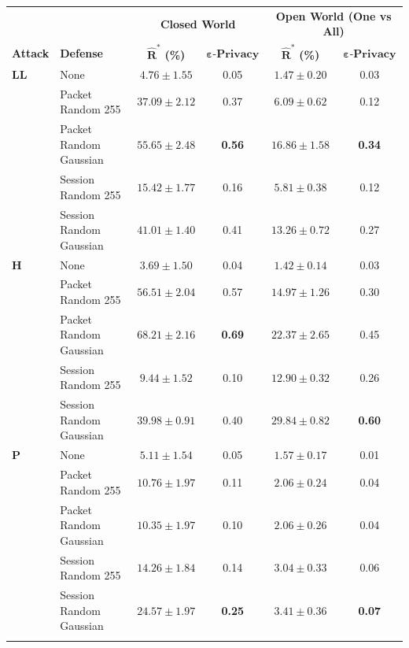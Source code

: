 \documentclass[
	ruledheaders=chapter,
	class=report,
	thesis={type=master, department=inf},
	accentcolor=1c,
	custommargins=true,
	marginpar=false,
	parskip=half-,
	fontsize=11pt,
]{tudapub}
\begin{document}
	\begin{table}
		\centering
		\small
		\begin{tabular}{llcccc}
			\toprule 
			& & \multicolumn{2}{c}{\textbf{Closed World}} & \multicolumn{2}{c}{\textbf{Open World (One vs All)}} \\
			\textbf{Attack} & \textbf{Defense} & $\mathbf{\widehat{R}^*}$ \textbf{(\%)} & $\mathbf{\varepsilon}\textbf{-Privacy}$ & $\mathbf{\widehat{R}^*}$ \textbf{(\%)} & $\mathbf{\varepsilon}\textbf{-Privacy}$ \\
			\midrule
			\textbf{LL} & None & $4.76 \pm 1.55$ & 0.05 & $1.47\pm 0.20$ & 0.03 \\
			 & Packet Random 255 & $37.09 \pm 2.12$ & 0.37 & $6.09\pm 0.62$ & 0.12 \\
			 & Packet Random Gaussian & $\mathbf{55.65 \pm 2.48}$ & \textbf{0.56} & $\mathbf{16.86\pm 1.58}$ & \textbf{0.34} \\
			 & Session Random 255 & $15.42 \pm 1.77$ & 0.16 & $5.81\pm 0.38$ & 0.12 \\
			 & Session Random Gaussian & $41.01 \pm 1.40$ & 0.41 & $13.26\pm 0.72$ & 0.27 \\ \addlinespace
			 
		    \textbf{H} & None & $3.69 \pm 1.50$ & 0.04 & $1.42\pm 0.14$ & 0.03 \\
			 & Packet Random 255 & $56.51 \pm 2.04$ & 0.57 & $14.97\pm 1.26$ & 0.30 \\
			 & Packet Random Gaussian & $\mathbf{68.21 \pm 2.16}$ & \textbf{0.69} & $22.37\pm 2.65$ & 0.45 \\
			 & Session Random 255 & $9.44 \pm 1.52$ & 0.10 & $12.90\pm 0.32$ & 0.26 \\
			 & Session Random Gaussian & $39.98 \pm 0.91$ & 0.40 & $\mathbf{29.84\pm 0.82}$ & \textbf{0.60} \\ \addlinespace
			 
			\textbf{P} & None & $5.11 \pm 1.54$ & 0.05 & $1.57 \pm 0.17$ & 0.01 \\
			 & Packet Random 255 & $10.76 \pm 1.97$ & 0.11 & $2.06 \pm 0.24$ & 0.04 \\
			 & Packet Random Gaussian & $10.35 \pm 1.97$ & 0.10 & $2.06 \pm 0.26$ & 0.04 \\
			 & Session Random 255 & $14.26 \pm 1.84$ & 0.14 & $3.04 \pm 0.33$ & 0.06 \\
			 & Session Random Gaussian & $\mathbf{24.57 \pm 1.97}$ & \textbf{0.25} & $\mathbf{3.41 \pm 0.36}$ & \textbf{0.07} \\ \addlinespace
			 

\end{tabular}
\end{table}
\end{document}
